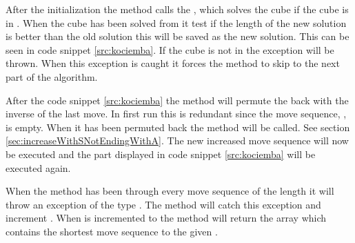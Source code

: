 After the initialization the  method calls the , which solves the cube if the cube is in . 
When the cube has been solved from  it test if the length of the new solution is better than the old solution this will be saved as the new solution. 
This can be seen in code snippet \ref{src:kociemba}.
If the cube is not in   the exception  will be thrown.
When this exception is caught it forces the  method to skip to the next part of the algorithm. 
\begin{comment}
 method to test if the cube is in \m{H}. 
 The method \vr{solveFromH} is called with a parameter, which determines how deep it will search.

If the \rubik{} is in \m{H} then \vr{solveFromH} will start solving it with \m{A} moves. If the \rubik{} is not inside \m{H} the \vr{solveFromH} will throw an exception called \vr{InvalidCubeException}. 

When the InvalidCubeException is caught by it cause 

\end{comment}

After the code snippet \ref{src:kociemba} the method will permute the \rubik{} back with the inverse of the last move. In first run this is redundant since the move sequence, , is empty. 
When it has been permuted back the method  will be called. 
See section \ref{sec:increaseWithSNotEndingWithA}. 
The new increased move sequence will now be executed and the part displayed in code snippet \ref{src:kociemba} will be executed again. 

When the method  has been through every move sequence of the length  it will throw an exception of the type  . 
The  method will catch this exception and increment . When  is incremented to  the method will return the array  which contains the shortest move sequence to the given \rubik{}.  
\begin{comment}
Thereafter it tests if \vr{d + c.length} > \vr{l}. 
If that is true, \vr{l} will be set equal to the sum of \vr{d + c.length} and the \vr{result} array will be initialized with the size \vr{l}. 
In the \vr{result} array the move sequence \vr{b} and the move sequence \vr{c} is added and the console will print the current \vr{result} and the time it took in seconds.

After the method has tested if \vr{d + c.length < l} the method will permute the \rubik{} back with the inverse of the last move. When it has been permuted the method \vr{increaseWithSNotEndingWithA} will be called. See section \ref{sec:increaseWithSNotEndingWithA}.

When the method \vr{increaseWithSNotEndingWithA} throws an exception of the type \vr{UnableToIncreaseMoveSequenceException} the method increments \vr{d}. 
When \vr{d} is incremented to \vr{l} the method will return the \vr{result} array.
\end{comment}
